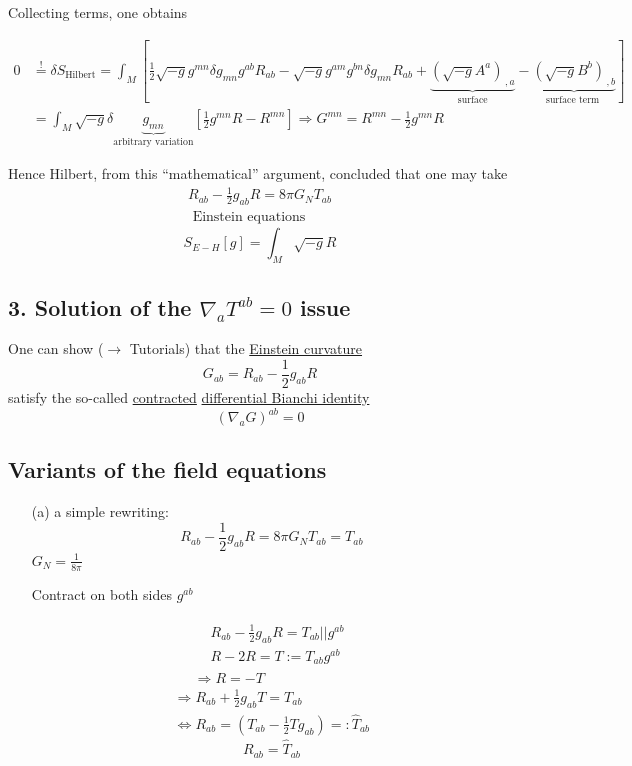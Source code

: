 \documentclass[10pt]{amsart}
\begin{document}
\begin{multicols*}{2}
	Collecting terms, one obtains
	
	\[
	\begin{aligned}
	0 & \overset{!}{=} \delta S_{\text{Hilbert}} = \int_M [ \frac{1}{2} \sqrt{-g} g^{mn} \delta g_{mn} g^{ab} R_{ab} - \sqrt{-g} g^{am} g^{bn} \delta g_{mn} R_{ab}+    \underbrace{ (\sqrt{-g}A^a)_{ \, , a} }_{ \text{surface} } - \underbrace{ ( \sqrt{-g} B^b)_{ \, , b } }_{ \text{surface term } } ] \\
	& = \int_M \sqrt{-g} \delta \underbrace{g_{mn}}_{ \text{arbitrary variation}} [ \frac{1}{2} g^{mn} R - R^{mn} ] \Longrightarrow G^{mn} = R^{mn} - \frac{1}{2} g^{mn} R
	\end{aligned}
	\]
	
	Hence Hilbert, from this ``mathematical'' argument, concluded that one may take
	\[
	\begin{gathered}
	\boxed{ R_{ab} - \frac{1}{2} g_{ab} R = 8 \pi G_N T_{ab} }  \\
	\text{ Einstein equations}
	\end{gathered}
	\]
	\[
	S_{E-H}[g] = \int_M \sqrt{-g}R
	\]
	
	\subsection{3. Solution of the $\nabla_a T^{ab} =0$ issue}
	
	One can show ($\to$ Tutorials) that the \underline{Einstein curvature}
	\[
	G_{ab} = R_{ab} - \frac{1}{2} g_{ab}R
	\]
	satisfy the so-called \underline{contracted} \underline{differential Bianchi identity}
	\[
	(\nabla_a G)^{ab} =0 
	\]
	
	\subsection{Variants of the field equations}
	
	\begin{enumerate}
		\item[(a)] a simple rewriting:
		\[
		R_{ab} - \frac{1}{2} g_{ab} R = 8 \pi G_N T_{ab} = T_{ab}
		\]
		$G_N = \frac{1}{8\pi}$
		
		Contract on both sides $g^{ab}$
		
		\[
		\begin{gathered}
		\begin{aligned}
		& R_{ab} - \frac{1}{2} g_{ab} R = T_{ab} || g^{ab} \\ 
		& R - 2R = T := T_{ab}g^{ab}
		\end{aligned} \\
		\Longrightarrow R = -T
		\end{gathered}
		\]
		\[
		\begin{gathered}
		\Longrightarrow R_{ab} + \frac{1}{2} g_{ab} T = T_{ab} \\
		\Longleftrightarrow R_{ab} = (T_{ab} - \frac{1}{2} Tg_{ab}) =: \widehat{T}_{ab}
		\end{gathered}
		\]
		\[
		\boxed{ R_{ab} = \widehat{T}_{ab}}
		\]
		

\end{enumerate}
\end{multicols*}
\end{document}
